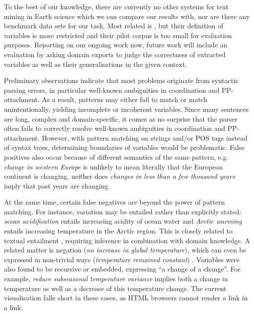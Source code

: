 \documentclass[11pt]{article}
\begin{document}
To the best of our knowledge, there are currently no other systems for text mining in Earth science which we can compare our results with, nor are there any benchmark data sets for our task.
Most related is \cite{marsi2014towards}, but their definition of variables is more restricted and their pilot corpus is too small for evaluation purposes.
Reporting on our ongoing work now, future work will include an evaluation by asking domain exports to judge the correctness of extracted variables as well as their generalisations in the given context. 

Preliminary observations indicate that most problems originate from syntactic parsing errors, in particular well-known ambiguities in coordination and PP-attachment.
As a result, patterns may either fail to match or match unintentionally, yielding incomplete or incoherent variables.     
Since many sentences are long, complex and domain-specific, it comes as no surprise that the parser often fails to correctly resolve well-known ambiguities in coordination and PP-attachment.
However, with pattern matching on strings and/or POS tags instead of syntax trees, determining boundaries of variables would be problematic.
False positives also occur because of different semantics of the same pattern, e.g. \emph{change in western Europe} is unlikely to mean literally that the European continent is changing, neither does \emph{changes in less than a few thousand years} imply that past years are changing.

At the same time, certain false negatives are beyond the power of pattern matching. 
For instance, variation may be entailed rather than explicitly stated:
\emph{ocean acidification} entails increasing acidity of ocean water and \emph{Arctic warming} entails increasing temperature in the Arctic region.
This is closely related to textual entailment \cite{AndroutsopoulosMalakasiotis:2010,DaganGlickmanMagnini:2006}, requiring inference in combination with domain knowledge.
A related matter is negation (\emph{no increase in global temperature}), which can even be expressed in non-trivial ways (\emph{temperature remained constant}) \cite{morante2009learning}.
Variables were also found to be recursive or embedded, expressing ``a change of a change''.  
For example, \emph{reduce subseasonal temperature variance} implies both a change in temperature as well as a decrease of this temperature change.
The current visualisation falls short in these cases, as HTML browsers cannot render a link in a link.
\end{document}

